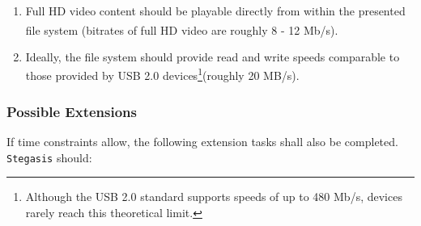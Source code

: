 \documentclass[paper=a4, fontsize=11pt,twoside]{scrartcl}
\numberwithin{table}{section}
\numberwithin{figure}{section}
\numberwithin{algorithm}{section}
\begin{document}
\begin{enumerate}
	\begin{enumerate}
		\item Full HD video content should be playable directly from within the presented file system (bitrates of full HD video are roughly 8 - 12 Mb/s\textsuperscript{\cite{bitrate}}).
		\item Ideally, the file system should provide read and write speeds comparable to those provided by USB 2.0 devices\footnote{Although the USB 2.0 standard supports speeds of up to 480 Mb/s, devices rarely reach this theoretical limit.}(roughly 20 MB/s\textsuperscript{\cite{usb2}}).
	\end{enumerate}		
\end{enumerate}

\subsubsection{Possible Extensions}

If time constraints allow, the following extension tasks shall also be completed.\\

\noindent
\texttt{Stegasis} should:
\end{document}
